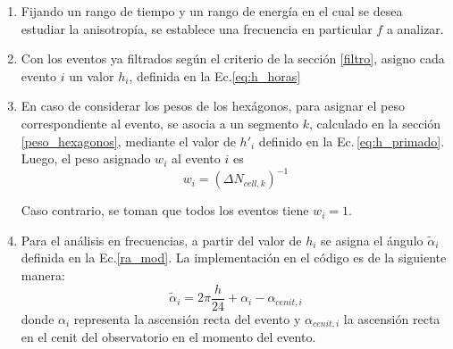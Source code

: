         \begin{enumerate}
        \item Fijando un rango de tiempo y un rango de energía en el cual se desea estudiar la anisotropía, se establece una frecuencia en particular $f$ a analizar.

        \item Con los eventos ya filtrados según el criterio de la sección \ref{filtro}, asigno cada evento $i$ un valor $h_i$, definida en la Ec.\ref{eq:h_horas}

        \item En caso de considerar los pesos de los hexágonos, para asignar el peso correspondiente al evento, se asocia a un segmento $k$, calculado en la sección \ref{peso_hexagonos}, mediante el valor de $h'_i$ definido en la Ec.\,\ref{eq:h_primado}. Luego, el peso asignado $w_i$  al evento $i$ es
        \begin{equation*}
           w_{i}= (\Delta N_{cell,k})^{-1}
        \end{equation*} 
        
        Caso contrario, se toman que todos los eventos tiene $w_i=1$.
        
        \item Para el análisis en frecuencias, a partir del valor de $h_i$ se asigna el ángulo $\tilde{\alpha}_i$ definida en la Ec.\ref{ra_mod}. La implementación en el código es de la siguiente manera:
        \begin{equation}
         \tilde{\alpha}_i = 2\pi \frac{h}{24} + \alpha_i -\alpha_{cenit,i}
        \end{equation}
        donde $\alpha_i$  representa la ascensión recta del evento y $\alpha_{cenit,i}$ la ascensión recta en el cenit del observatorio en el momento del evento. %


\end{enumerate}

